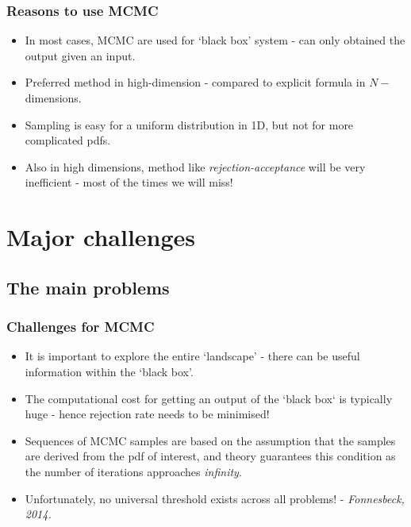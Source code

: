 \documentclass[10pt]{beamer}
\begin{document}
\begin{frame}
	\frametitle{Reasons to use MCMC}
	\begin{itemize}
		\item In most cases, MCMC are used for `black box' system - can only obtained the output given an input.
		\item Preferred method in high-dimension - compared to explicit formula in $N-$dimensions.
		\item Sampling is easy for a uniform distribution in 1D, but not for more complicated pdfs.
		\item Also in high dimensions, method like \textit{rejection-acceptance} will be very inefficient - most of the times we will miss!
	\end{itemize}
\end{frame}

\section{Major challenges}
\subsection{The main problems}

\begin{frame}
	\frametitle{Challenges for MCMC}
	\begin{itemize}
		\item It is important to explore the entire `landscape' - there can be useful information within the `black box'.
		\item The computational cost for getting an output of the `black box` is typically huge - hence rejection rate needs to be minimised!
		\item Sequences of MCMC samples are based on the assumption that the samples are derived from the pdf of interest, and theory guarantees this condition as the number of iterations approaches \textit{infinity}.
		\item Unfortunately, no universal threshold exists across all problems! - \textit{ \small{Fonnesbeck, 2014.}}
	\end{itemize}
\end{frame}
\end{document}
